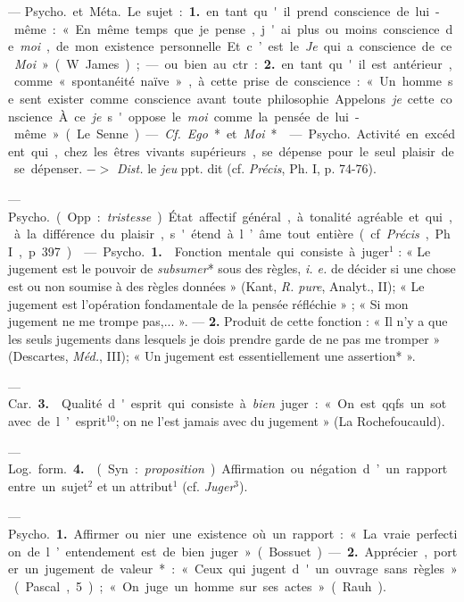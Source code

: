 
	\begin{itemize}[leftmargin=1cm, label=, itemsep=1pt]
	
 — \si{Psycho.} et \si{Méta.} Le sujet : {\bf 1.} en tant qu'il prend
conscience de lui-même : « En même temps que je pense, j'ai plus ou moins
conscience de {\it moi}, de mon existence personnelle. Et c’est le {\it Je}
qui a conscience de ce {\it Moi} » (W. James) ; — ou bien au ctr. : {\bf 2.}
en tant qu'il est antérieur, comme « spontanéité naïve », à cette prise de
conscience : « Un homme se sent exister comme conscience avant toute
philosophie... Appelons {\it je} cette conscience... À ce {\it je} s'oppose le
{\it moi} comme la pensée de lui-même » (Le Senne). — {\it Cf.} {\it Ego}* et
{\it Moi}*.

 — \si{Psycho.} Activité en excédent qui, chez les êtres
vivants supérieurs, se dépense pour le seul plaisir de se dépenser. $->$
{\it Dist.} le {\it jeu} ppt. dit (cf. {\it Précis}, Ph. I, p. 74-76).

 — \si{Psycho.} (Opp. : {\it tristesse}). État affectif
général, à tonalité agréable et qui, à la différence du plaisir, s'étend à
l’âme tout entière (cf. {\it Précis}, Ph. I, p. 397).

 — \si{Psycho.} {\bf 1.}  Fonction mentale qui
consiste à juger$^1$ : « Le jugement est le pouvoir de {\it subsumer}* sous
des règles, {\it i. e.} de décider si une chose est ou non soumise à des
règles données » (Kant, {\it R. pure}, Analyt., II); « Le jugement est
l’opération fondamentale de la pensée réfléchie » ; « Si mon jugement ne me
trompe pas,... ». —  {\bf 2.}  Produit de cette fonction : « Il
n’y a que les seuls jugements dans lesquels je dois prendre garde de ne pas me
tromper » (Descartes, {\it Méd.}, III); « Un jugement est essentiellement une
assertion* ».

— \si{Car.} {\bf 3.}  Qualité d'esprit qui consiste à
{\it bien} juger : « On est qqfs. un sot avec de l’esprit$^{10}$; on ne l’est
jamais avec du jugement » (La Rochefoucauld).

— \si{Log.} \si{form.} {\bf 4.}  (Syn. : {\it proposition}).
Affirmation ou négation d’un rapport entre un sujet$^2$ et un attribut$^1$
(cf. {\it Juger}$^3$).

 — \si{Psycho.} {\bf 1.} Affirmer ou nier une existence où un
rapport : « La vraie perfection de l’entendement est de bien
juger » (Bossuet). — {\bf 2.} Apprécier, porter un jugement de valeur* :
« Ceux qui jugent d'un ouvrage sans règles... » (Pascal, 5) ; « On juge un
homme sur ses actes » (Rauh).


\end{itemize}
